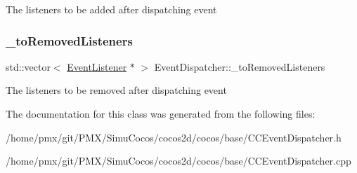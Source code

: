 The listeners to be added after dispatching event \mbox{\label{classEventDispatcher_a08ef695c1122ea1763b37de776eb7806}} 
\subsubsection{\texorpdfstring{\+\_\+to\+Removed\+Listeners}{\_toRemovedListeners}}
{\footnotesize\ttfamily std\+::vector$<$ \hyperlink{classEventListener}{Event\+Listener} $\ast$ $>$ Event\+Dispatcher\+::\+\_\+to\+Removed\+Listeners\hspace{0.3cm}{\ttfamily [protected]}}

The listeners to be removed after dispatching event 

The documentation for this class was generated from the following files\+:\begin{DoxyCompactItemize}
\item 
/home/pmx/git/\+P\+M\+X/\+Simu\+Cocos/cocos2d/cocos/base/C\+C\+Event\+Dispatcher.\+h\item 
/home/pmx/git/\+P\+M\+X/\+Simu\+Cocos/cocos2d/cocos/base/C\+C\+Event\+Dispatcher.\+cpp\end{DoxyCompactItemize}
